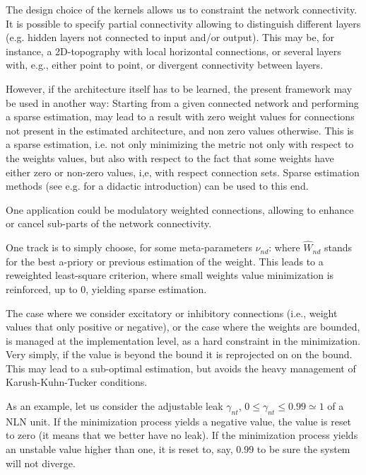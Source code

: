 The design choice of the kernels allows us to constraint the network connectivity. It is possible to specify partial connectivity allowing to distinguish different layers (e.g. hidden layers not connected to input and/or output).
This may be, for instance, a 2D-topography with local horizontal connections, or several layers with, e.g., either point to point, or divergent connectivity between layers.

However, if the architecture itself has to be learned, the present framework may be used in another way: Starting from a given connected network and performing a sparse estimation, may lead to a result with zero weight values for connections not present in the estimated architecture, and non zero values otherwise. This is a sparse estimation, i.e. not only minimizing the metric not only with respect to the weights values, but also with respect to the fact that some weights have either zero or non-zero values, i,e, with respect connection sets. Sparse estimation methods (see e.g. \cite{tropp:04a,tropp:04b} for a didactic introduction) can be used to this end. 

One application could be modulatory weighted connections, allowing to enhance or cancel sub-parts of the network connectivity.

One track is to simply choose, for some meta-parameters $\nu_{nd}$: 
where $\hat{W}_{nd}$ stands for the best a-priory or previous estimation of the weight. This leads to a reweighted least-square criterion, where small weights value minimization is reinforced, up to $0$, yielding sparse estimation.

The case where we consider excitatory or inhibitory connections (i.e., weight values that only positive or negative), or the case where the weights are bounded, is managed at the implementation level, as a hard constraint in the minimization. Very simply, if the value is beyond the bound it is reprojected on on the bound. This may lead to a sub-optimal estimation, but avoids the heavy management of Karush-Kuhn-Tucker conditions.

As an example, let us consider the adjustable leak $\gamma_{nt}$, $0 \leq \gamma_{nt} \leq 0.99 \simeq 1$ of a NLN unit. If the minimization process yields a negative value, the value is reset to zero (it means that we better have no leak). If the minimization process yields an unstable value higher than one, it is reset to, say, $0.99$ to be sure the system will not diverge.

